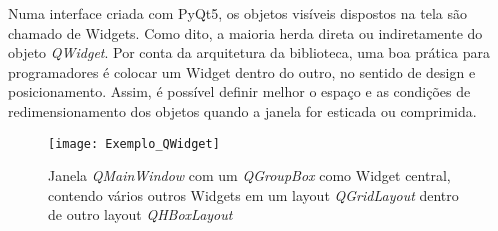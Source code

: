 Numa interface criada com PyQt5, os objetos visíveis dispostos na tela são chamado de Widgets. Como dito, a maioria herda direta ou indiretamente do objeto \emph{QWidget}. Por conta da arquitetura da biblioteca, uma boa prática para programadores é colocar um Widget dentro do outro, no sentido de design e posicionamento. Assim, é possível definir melhor o espaço e as condições de redimensionamento dos objetos quando a janela for esticada ou comprimida.

\begin{figure}[H]
\centering
\texttt{[image: Exemplo\_QWidget]}
\caption{Janela \emph{QMainWindow} com um \emph{QGroupBox} como Widget central, contendo vários outros Widgets em um layout \emph{QGridLayout} dentro de outro layout \emph{QHBoxLayout}}
\label{img_exemplo_qwidget}
\end{figure}
